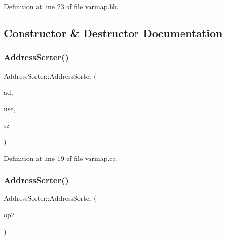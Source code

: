 Definition at line 23 of file varmap.\+hh.



\subsection{Constructor \& Destructor Documentation}
\mbox{\label{class_address_sorter_adf305458ec94fcb21a7a6506ecfd4582}} 
\subsubsection{\texorpdfstring{AddressSorter()}{AddressSorter()}\hspace{0.1cm}{\footnotesize\ttfamily [1/2]}}
{\footnotesize\ttfamily Address\+Sorter\+::\+Address\+Sorter (\begin{DoxyParamCaption}\item[{const \mbox{\hyperlink{class_address}{Address}} \&}]{ad,  }\item[{const \mbox{\hyperlink{class_address}{Address}} \&}]{use,  }\item[{int4}]{sz }\end{DoxyParamCaption})}



Definition at line 19 of file varmap.\+cc.

\mbox{\label{class_address_sorter_a9b2a674adba86aaaf53a2c4220b0006c}} 
\subsubsection{\texorpdfstring{AddressSorter()}{AddressSorter()}\hspace{0.1cm}{\footnotesize\ttfamily [2/2]}}
{\footnotesize\ttfamily Address\+Sorter\+::\+Address\+Sorter (\begin{DoxyParamCaption}\item[{const \mbox{\hyperlink{class_address_sorter}{Address\+Sorter}} \&}]{op2 }\end{DoxyParamCaption})\hspace{0.3cm}{\ttfamily [inline]}}



